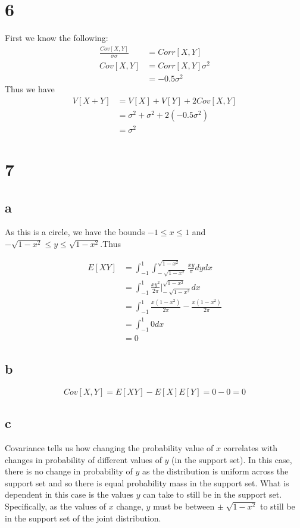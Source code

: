 \documentclass[10pt]{article}
\begin{document}
\section*{6}

First we know the following:
\begin{align*}
    \frac{Cov[X,Y]}{\sigma\sigma}&= Corr[X,Y]\\
    Cov[X,Y] &= Corr[X,Y]\sigma^2\\
    &= -0.5\sigma^2
\end{align*}
Thus we have
\begin{align*}
    V[X+Y] &= V[X] + V[Y] + 2Cov[X,Y]\\
    &= \sigma^2 + \sigma^2 + 2(-0.5\sigma^2)\\
    &=\sigma^2
\end{align*}

\section*{7}
\subsection*{a}

As this is a circle, we have the bounds $-1\le x\le 1$ and $-\sqrt{1-x^2}\le y\le \sqrt{1-x^2}.$Thus

\begin{align*}
    E[XY] &= \int_{-1}^1\int_{-\sqrt[]{1-x^2}}^{\sqrt{1-x^2}}\frac{xy}{\pi}dydx\\
    &=\int_{-1}^1 \frac{xy^2}{2\pi}\Bigr |_{-\sqrt[]{1-x^2}}^{\sqrt{1-x^2}} dx\\
    &= \int_{-1}^1 \frac{x(1-x^2)}{2\pi}-\frac{x(1-x^2)}{2\pi}\\
    &=\int_{-1}^1 0dx\\
    &= 0
\end{align*}

\subsection*{b}
\[Cov[X,Y]=E[XY]-E[X]E[Y]=0-0=0\]


\subsection*{c}

Covariance tells us how changing the probability value of $x$ correlates with changes in probability of different values of $y$ (in the support set). In this case, there is no change in probability of $y$ as the distribution is uniform across the support set and so there is equal probability mass in the support set. What is dependent in this case is the values $y$ can take to still be in the support set. Specifically, as the values of $x$ change, $y$ must be between $\pm\sqrt[]{1-x^2}$ to still be in the support set of the joint distribution.
\end{document}
